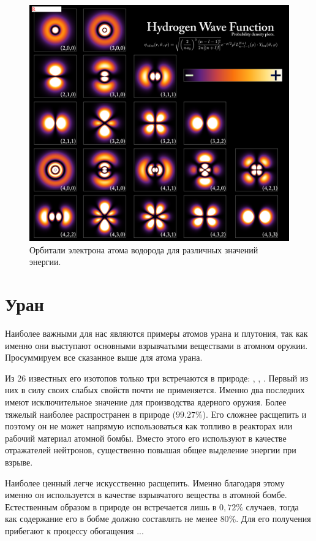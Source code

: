 \begin{figure}[t!]
   \centering
   \includegraphics[scale=0.2]{images/hydrogen_electron_energy}
   \caption{Орбитали электрона атома водорода для различных значений энергии.}
   \label{fig:hydrogen_electron_energy}
\end{figure}



\section*{Уран}

Наиболее важными для нас являются примеры атомов урана и плутония, так как именно они выступают основными взрывчатыми веществами в атомном оружии.
Просуммируем все сказанное выше для атома урана.

Из 26 известных его изотопов только три встречаются в природе: , , .
Первый из них в силу своих слабых свойств почти не применяется.
Именно два последних имеют исключительное значение для производства ядерного оружия.
Более тяжелый  наиболее распространен в природе ($99.27\%$).
Его сложнее расщепить и поэтому он не может напрямую использоваться как топливо в реакторах или рабочий материал атомной бомбы.
Вместо этого его используют в качестве отражателей нейтронов, существенно повышая общее выделение энергии при взрыве.

Наиболее ценный  легче искусственно расщепить.
Именно благодаря этому именно он используется в качестве взрывчатого вещества в атомной бомбе.
Естественным образом в природе он встречается лишь в $0,72\%$ случаев, тогда как содержание его в бобме должно составлять не менее $80\%$.
Для его получения прибегают к процессу обогащения ... 

